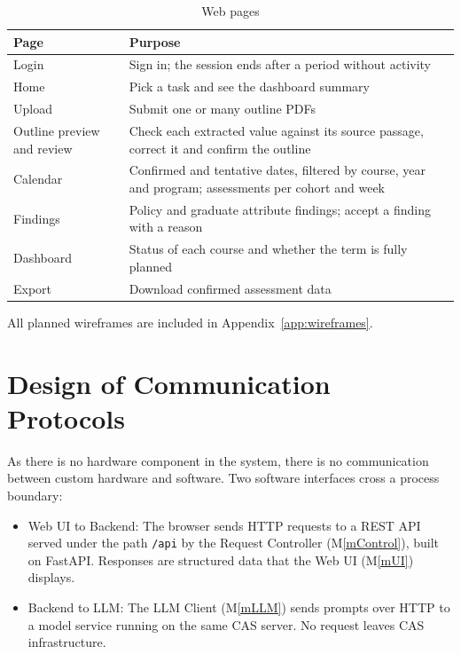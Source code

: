 \documentclass[12pt, titlepage]{article}
\newcommand{\mref}[1]{M\ref{#1}}
\begin{document}
\begin{table}[H]
\centering
\begin{tabular}{p{} p{} p{}}
\toprule
\textbf{Page} & \textbf{Purpose} \\
\midrule
Login & Sign in; the session ends after a period without activity\\
Home & Pick a task and see the dashboard summary\\
Upload & Submit one or many outline PDFs\\
Outline preview and review & Check each extracted value against its source
passage, correct it and confirm the outline\\
Calendar & Confirmed and tentative dates, filtered by course, year and program;
assessments per cohort and week\\
Findings & Policy and graduate attribute findings; accept a finding with a
reason\\
Dashboard & Status of each course and whether the term is fully planned \\
Export & Download confirmed assessment data\\
\bottomrule
\end{tabular}
\caption{Web pages}
\label{TblPages}
\end{table}

All planned wireframes are included in Appendix~\ref{app:wireframes}.


\section{Design of Communication Protocols} \label{SecComms}


As there is no hardware component in the system, there is no communication between 
custom hardware and software. Two software interfaces cross a process boundary:

\begin{itemize}
  \item Web UI to Backend: The browser sends HTTP requests to a REST API served under 
  the path \texttt{/api} by the Request Controller (\mref{mControl}), built on 
  FastAPI. Responses are structured data that the Web UI (\mref{mUI}) displays.
  \item Backend to LLM: The LLM Client (\mref{mLLM}) sends
  prompts over HTTP to a model service running on the same CAS server. No 
  request leaves CAS infrastructure.
\end{itemize}
\end{document}
